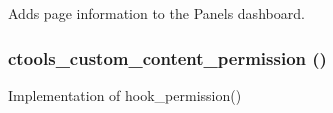 Adds page information to the Panels dashboard. \hypertarget{ctools__custom__content_8module_a5f5ede01b7a02c98d68d8085937decc5}{
\subsubsection[{ctools\_\-custom\_\-content\_\-permission}]{\setlength{\rightskip}{0pt plus 5cm}ctools\_\-custom\_\-content\_\-permission ()}}
\label{ctools__custom__content_8module_a5f5ede01b7a02c98d68d8085937decc5}
Implementation of hook\_\-permission() 